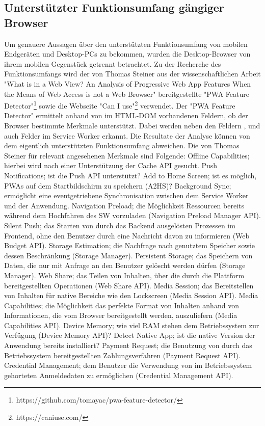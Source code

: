\subsection{Unterstützter Funktionsumfang gängiger Browser}
\label{subsec:unterstuetzterfunktionsumfanggaengigerbrowser}
Um genauere Aussagen über den unterstützten Funktionsumfang von mobilen Endgeräten
und Desktop-PCs zu bekommen, wurden die Desktop-Browser von ihrem mobilen
Gegenstück getrennt betrachtet. Zu der Recherche des Funktionsumfangs wird
der von Thomas Steiner aus der wissenschaftlichen Arbeit "What is
in a Web View? An Analysis of Progressive Web App Features When the
Means of Web Access is not a Web Browser" bereitgestellte
"PWA Feature Detector"\footnote{https://github.com/tomayac/pwa-feature-detector/} sowie 
die Webseite "Can I use"\footnote{https://caniuse.com/} verwendet.
Der "PWA Feature Detector" ermittelt anhand von im HTML-DOM
vorhandenen Feldern, ob der Browser bestimmte Merkmale unterstützt.
Dabei werden neben den Feldern ,  und 
auch Felder im Service Worker erkannt. Die Resultate der Analyse können von dem
eigentlich unterstützten Funktionsumfang abweichen. Die von Thomas
Steiner für relevant angesehenen Merkmale sind Folgende:
Offline Capabilities; hierbei wird nach
einer Unterstützung der Cache API gesucht. Push Notifications;
ist die Push API unterstützt? Add to Home Screen; ist es möglich, PWAs auf
dem Startbildschirm zu speichern (A2HS)? Background Sync; ermöglicht eine eventgetriebene Synchronisation
zwischen dem Service Worker und der Anwendung. Navigation Preload; die Möglichkeit
Ressourcen bereits während dem Hochfahren des SW vorzuladen
(Navigation Preload Manager API). Silent Push; das Starten von durch das
Backend ausgelösten Prozessen im Frontend, ohne den Benutzer
durch eine Nachricht davon zu informieren (Web Budget API).
Storage Estimation; die Nachfrage nach genutztem Speicher sowie
dessen Beschränkung (Storage Manager). Persistent Storage;
das Speichern von Daten, die nur mit Anfrage an den Benutzer gelöscht
werden dürfen (Storage Manager). Web Share; das Teilen von Inhalten,
über die durch die Plattform bereitgestellten Operationen (Web Share API).
Media Session; das Bereitstellen von Inhalten für native
Bereiche wie den Lockscreen (Media Session API). Media Capabilities;
die Möglichkeit das perfekte Format von Inhalten anhand von
Informationen, die vom Browser bereitgestellt werden, auszuliefern (Media Capabilities API).
Device Memory; wie viel RAM stehen dem Betriebssystem zur
Verfügung (Device Memory API)? Detect Native App; ist die native Version
der Anwendung bereits installiert? Payment Request;
die Benutzung von durch das Betriebssystem bereitgestellten
Zahlungsverfahren (Payment Request API). Credential Management;
dem Benutzer die Verwendung von im Betriebssystem gehorteten
Anmeldedaten zu ermöglichen (Credential Management API).\cite[Abschnitt 2.3]{WhatIsInAWebView}

